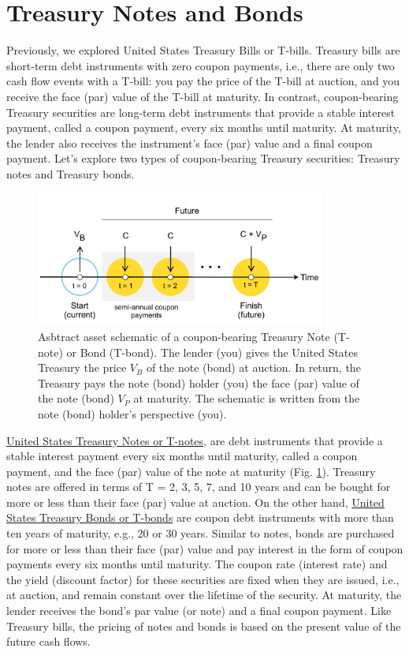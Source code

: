 \documentclass[11pt]{article}
\theoremstyle{definition}
\begin{document}
\section*{Treasury Notes and Bonds}
Previously, we explored United States Treasury Bills or T-bills. Treasury bills are short-term debt instruments with zero coupon payments, 
i.e., there are only two cash flow events with a T-bill: you pay the price of the T-bill at auction, and you receive the face (par) value of the T-bill at maturity. 
In contrast, coupon-bearing Treasury securities are long-term debt instruments that provide a stable interest payment, called a coupon payment, every six months until maturity.
At maturity, the lender also receives the instrument's face (par) value and a final coupon payment.
Let's explore two types of coupon-bearing Treasury securities: Treasury notes and Treasury bonds.
\begin{figure}[h]
    \centering
    \includegraphics[width=0.85\textwidth]{./figs/Fig-Bond-Asset-Timeline-Schematic.pdf}
    \caption{Asbtract asset schematic of a coupon-bearing Treasury Note (T-note) or Bond (T-bond). 
	The lender (you) gives the United States Treasury 
    the price $V_{B}$ of the note (bond) at auction. In return, the Treasury pays the note (bond) holder (you) the face (par) value of the note (bond) $V_{P}$ at maturity. 
	The schematic is written from the note (bond) holder's perspective (you).}\label{fig:govt-note-bond-schematic}
\end{figure}

\href{https://treasurydirect.gov/marketable-securities/treasury-notes/}{United States Treasury Notes or T-notes}, 
are debt instruments that provide a stable interest payment every six months until maturity, called a coupon payment, and the face (par) value of the note at maturity (Fig. \ref{fig:govt-note-bond-schematic}).
Treasury notes are offered in terms of T = 2, 3, 5, 7, and 10 years and can be bought for more or less than their face (par) value at auction.
 On the other hand,  \href{https://treasurydirect.gov/marketable-securities/treasury-bonds/}{United States Treasury Bonds or T-bonds} 
are coupon debt instruments with more than ten years of maturity, e.g., 20 or 30 years. Similar to notes, bonds are purchased for more or less than their face (par) value and pay interest in the form of coupon payments every six months until maturity.
The coupon rate (interest rate) and the yield (discount factor) for these securities are fixed when they are issued, i.e., at auction, and remain constant over the lifetime of the security.
At maturity, the lender receives the bond's par value (or note) and a final coupon payment. 
Like Treasury bills, the pricing of notes and bonds is based on the present value of the future cash flows. 
\end{document}
